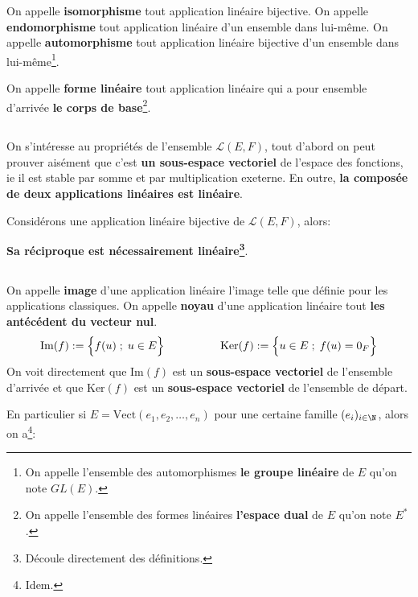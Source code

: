 On appelle \textbf{isomorphisme} tout application linéaire bijective.\+
On appelle \textbf{endomorphisme} tout application linéaire d'un ensemble dans lui-même.\+
On appelle \textbf{automorphisme} tout application linéaire bijective d'un ensemble dans lui-même\footnote[1]{On appelle l'ensemble des automorphismes \textbf{le groupe linéaire} de \(E\) qu'on note \(GL(E)\).}.\<

On appelle \textbf{forme linéaire} tout application linéaire qui a pour ensemble d'arrivée \textbf{le corps de base}\footnote[2]{On appelle l'ensemble des formes linéaires \textbf{l'espace dual} de \(E\) qu'on note \(E^*\).}.

\subsection*{}

On s'intéresse au propriétés de l'ensemble \(\mathcal{L}(E, F)\), tout d'abord on peut prouver aisément que c'est \textbf{un sous-espace vectoriel} de l'espace des fonctions, ie il est stable par somme et par multiplication exeterne.\+
En outre, \textbf{la composée de deux applications linéaires est linéaire}.\<

Considérons une application linéaire bijective de \(\mathcal{L}(E, F)\), alors:
\begin{center}
   \textbf{Sa réciproque est nécessairement linéaire\footnote[3]{Découle directement des définitions.}}.
\end{center}

\subsection*{}

On appelle \textbf{image} d'une application linéaire l'image telle que définie pour les applications classiques.\+
On appelle \textbf{noyau} d'une application linéaire tout \textbf{les antécédent du vecteur nul}.\+
\[
   \text{Im}(f) := \Bigl\{ f(u) \; ; \; u \in E \Bigl\}
   \quad\quad\quad\quad\quad
   \text{Ker}(f) := \Bigl\{ u \in E \; ; \; f(u) = 0_F \Bigl\}
\]
On voit directement que \(\text{Im}(f)\) est un \textbf{sous-espace vectoriel} de l'ensemble d'arrivée et que \(\text{Ker}(f)\) est un \textbf{sous-espace vectoriel} de l'ensemble de départ.\<

En particulier si \(E = \text{Vect}(e_1, e_2, \ldots, e_n)\) pour une certaine famille \((e_i)_{i\in \N}\), alors on a\footnote[5]{Idem.}:

